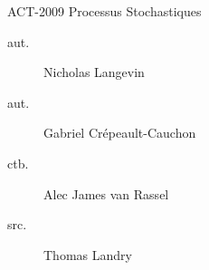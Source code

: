 \begin{contrib}{ACT-2009\: Processus Stochastiques}
\begin{description}
	\item[aut.] Nicholas Langevin
	\item[aut.] Gabriel Crépeault-Cauchon 
	\item[ctb.] Alec James van Rassel
	\item[src.] Thomas Landry
\end{description}
\end{contrib}
